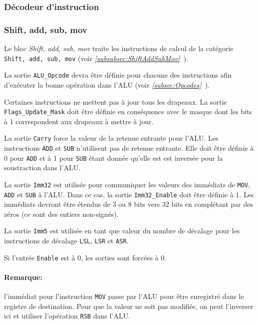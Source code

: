 \subsubsection{Décodeur d'instruction}

\subsubsection{Shift, add, sub, mov}


Le bloc \textit{Shift, add, sub, mov} traite les instructions de calcul de la catégorie \texttt{Shift, add, sub, mov} (voir \textit{\ref{subsubsec:ShiftAddSubMov}~}).

La sortie \texttt{ALU\_Opcode} devra être définie pour chacune des instructions afin d'exécuter la bonne opération dans l'ALU (voir \textit{\ref{subsec:Opcodes}~}).

Certaines instructions ne mettent pas à jour tous les drapeaux. La sortie \texttt{Flags\_Update\_Mask} doit être définie en conséquence avec le masque dont les bits à 1 correspondent aux drapeaux à mettre à jour.

La sortie \texttt{Carry} force la valeur de la retenue entrante pour l'ALU. Les instructions \texttt{ADD} et \texttt{SUB} n'utilisent pas de retenue entrante.
Elle doit être définie à 0 pour \texttt{ADD} et à 1 pour \texttt{SUB} étant donnée qu'elle est est inversée pour la soustraction dans l'ALU.

La sortie \texttt{Imm32} est utilisée pour communiquer les valeurs des immédiats de \texttt{MOV}, \texttt{ADD} et \texttt{SUB} à l'ALU. Dans ce cas, la sortie \texttt{Imm32\_Enable} doit être définie à 1.
Les immédiats devront être étendus de 3 ou 8 bits vers 32 bits en complétant par des zéros (ce sont des entiers non-signés).

La sortie \texttt{Imm5} est utilisée en tant que valeur du nombre de décalage pour les instructions de décalage \texttt{LSL}, \texttt{LSR} et \texttt{ASR}.

Si l'entrée \texttt{Enable} est à 0, les sorties sont forcées à 0.

\paragraph{Remarque:} l'immédiat pour l'instruction \texttt{MOV} passe par l'ALU pour être enregistré dans le registre de destination.
Pour que la valeur ne soit pas modifiée, on peut l'inverser ici et utiliser l'opération \texttt{RSB} dans l'ALU.

